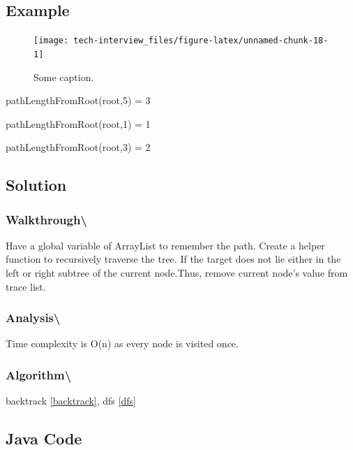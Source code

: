 \documentclass[]{book}
\begin{document}
\hypertarget{example-56}{%
\subsection{Example}\label{example-56}}

\begin{figure}
\texttt{[image: tech-interview\_files/figure-latex/unnamed-chunk-18-1]} \caption{Some caption.}\label{fig:unnamed-chunk-18}
\end{figure}

pathLengthFromRoot(root,5) = 3

pathLengthFromRoot(root,1) = 1

pathLengthFromRoot(root,3) = 2

\hypertarget{solution-40}{%
\subsection{Solution}\label{solution-40}}

\hypertarget{walkthrough-62}{%
\subsubsection{Walkthrough\textbackslash{}}\label{walkthrough-62}}

Have a global variable of ArrayList to remember the path. Create a helper function to recursively traverse the tree.
If the target does not lie either in the left or right subtree of the current node.Thus, remove current node's value
from trace list.

\hypertarget{analysis-69}{%
\subsubsection{Analysis\textbackslash{}}\label{analysis-69}}

Time complexity is O(n) as every node is visited once.

\hypertarget{algorithm-71}{%
\subsubsection{Algorithm\textbackslash{}}\label{algorithm-71}}

backtrack \ref{backtrack}, dfs \ref{dfs}

\hypertarget{java-code-44}{%
\subsection{Java Code}\label{java-code-44}}
\end{document}
